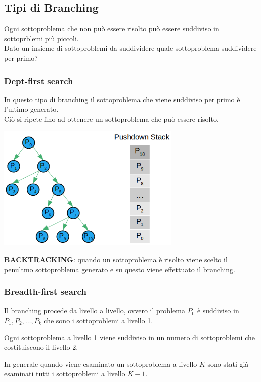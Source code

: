 \subsection{Tipi di Branching}
Ogni sottoproblema che non può essere risolto può essere suddiviso in sottoprblemi più piccoli.\\
Dato un insieme di sottoproblemi da suddividere quale sottoproblema suddividere per primo?

\subsubsection{Dept-first search}
In 	questo tipo di branching il sottoproblema che viene suddiviso per primo è l'ultimo generato.\\
Ciò si ripete fino ad ottenere un sottoproblema che può essere risolto.

\centerline{\includegraphics[height=6cm]{images/graph17.png}}

\textbf{BACKTRACKING}: quando un sottoproblema è risolto viene scelto il penultmo sottoproblema generato e su questo viene effettuato il branching.

\subsubsection{Breadth-first search}
Il branching procede da livello a livello, ovvero il problema $P_{0}$ è suddiviso in $P_{1},P_{2},\dots,P_{k}$ che sono i sottoproblemi a livello 1.

Ogni sottoproblema a livello 1 viene suddiviso in un numero di sottoproblemi che costituiscono il livello 2.

In generale quando viene esaminato un sottoproblema a livello $K$ sono stati già esaminati tutti i sottoproblemi a livello $K-1$.


